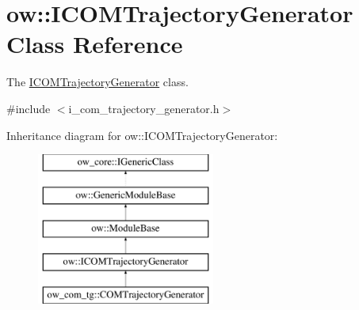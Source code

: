 \hypertarget{classow_1_1ICOMTrajectoryGenerator}{}\section{ow\+:\+:I\+C\+O\+M\+Trajectory\+Generator Class Reference}
\label{classow_1_1ICOMTrajectoryGenerator}


The \hyperlink{classow_1_1ICOMTrajectoryGenerator}{I\+C\+O\+M\+Trajectory\+Generator} class.  




{\ttfamily \#include $<$i\+\_\+com\+\_\+trajectory\+\_\+generator.\+h$>$}

Inheritance diagram for ow\+:\+:I\+C\+O\+M\+Trajectory\+Generator\+:\begin{figure}[H]
\begin{center}
\leavevmode
\includegraphics[height=5.000000cm]{d3/d6d/classow_1_1ICOMTrajectoryGenerator}
\end{center}
\end{figure}
